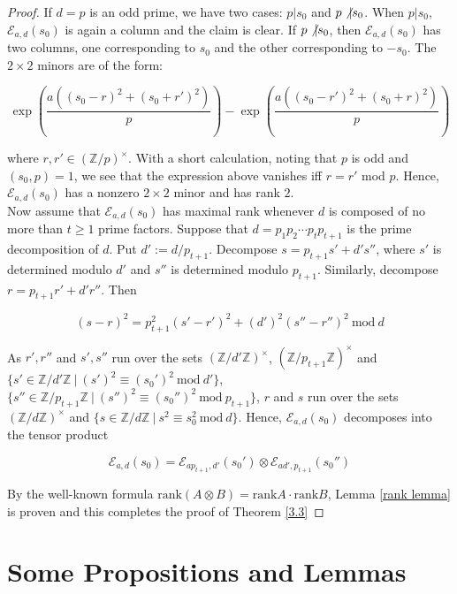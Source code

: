 \documentclass[11pt]{article}
\theoremstyle{definition}
\theoremstyle{remark}
\newcommand{\Z}{\mathbb{Z}}
\begin{document}
\begin{proof}
If $d = p$ is an odd prime, we have two cases: $p \vert s_0$ and $p 
\not\vert s_0$. When $p \vert s_0$, $\mathcal{E}_{a,d}(s_0)$ is again a column and the claim is clear. If $p \not\vert s_0$, then $\mathcal{E}_{a,d}(s_0)$ has two columns, one corresponding to $s_0$ and the other corresponding to $-s_0$. The $2 \times 2$ minors are of the form:

\[
\exp\left( \frac{a((s_0-r)^2 + (s_0+r')^2)}{p} \right) - \exp\left( \frac{a((s_0-r')^2 + (s_0+r)^2)}{p}\right)
\]

where $r,r' \in (\Z/p)^\times$. With a short calculation, noting that $p$ is odd and $(s_0,p) = 1$, we see that the expression above vanishes iff $r = r'$ mod $p$. Hence, $\mathcal{E}_{a,d}(s_0)$ has a nonzero $2 \times 2$ minor and has rank $2$. \\

Now assume that $\mathcal{E}_{a,d}(s_0)$ has maximal rank whenever $d$ is composed of no more than $t \geq 1$ prime factors. Suppose that $d = p_1 p_2 \cdots p_t p_{t+1}$ is the prime decomposition of $d$. Put $d' := d/p_{t+1}$. Decompose $s = p_{t+1}s' + d's''$, where $s'$ is determined modulo $d'$ and $s''$ is determined modulo $p_{t+1}$. Similarly, decompose $r = p_{t+1}r' + d' r''$. Then 

\[
(s-r)^2 = p_{t+1}^2(s'-r')^2 + (d')^2(s''-r'')^2 \ \text{mod} \ d
\]

As $r',r''$ and $s',s''$ run over the sets $(\Z/d'\Z)^\times$, $(\Z/p_{t+1}\Z)^\times$ and $\{s' \in \Z/d'\Z \ \vert \ (s')^2 \equiv (s_0')^2 \ \text{mod} \ d'\}$, $\{s'' \in \Z/p_{t+1}\Z \ \vert \ (s'')^2 \equiv (s_0'')^2 \ \text{mod} \ p_{t+1}\}$, $r$ and $s$ run over the sets $(\Z/d\Z)^\times$ and $\{s \in \Z/d\Z \ \vert \ s^2 \equiv s_0^2 \ \text{mod} \ d\}$. Hence, $\mathcal{E}_{a,d}(s_0)$ decomposes into the tensor product 

\[
\mathcal{E}_{a,d}(s_0) = \mathcal{E}_{ap_{t+1}, d'}(s_0') \otimes \mathcal{E}_{ad', p_{t+1}}(s_0'')
\]

By the well-known formula $\text{rank}(A \otimes B) = \text{rank}A \cdot \text{rank}B$, Lemma \ref{rank lemma} is proven and this completes the proof of Theorem \ref{3.3}

\end{proof}


 

\section{Some Propositions and Lemmas} \label{props and lemmas}
\end{document}
